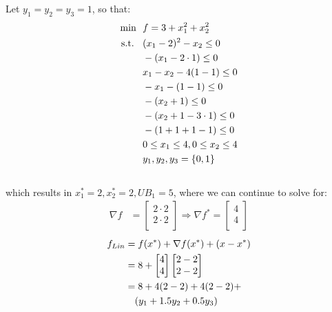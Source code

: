 \documentclass{article}
\begin{document}
Let $y_1 = y_2 = y_3 = 1$, so that:
\begin{equation}
\begin{split}
    \text{min \space} & f = 3 + x_{1}^{2} + x_{2}^{2}\\
    \text{s.t. \space} 
    & \space (x_1 - 2)^2 -x_2 \leq 0\\
    & -(x_1 - 2 \cdot 1) \leq 0\\
    & x_1 - x_2 - 4(1 - 1) \leq 0\\
    & - x_1 - (1 - 1) \leq 0\\
    & - (x_2 + 1) \leq 0\\
    & - (x_2 + 1 - 3 \cdot 1)\leq 0\\
    & - (1 + 1 + 1 - 1) \leq 0\\
    & 0 \leq x_1 \leq 4, 0 \leq x_2 \leq 4\\
    & y_1, y_2, y_3 = \{0, 1\}\\
\end{split}
\end{equation}
\\
which results in $x_{1}^{*} = 2, x_{2}^{*} = 2, UB_1 = 5$, where we can continue to solve for:
\begin{equation}
\begin{split}
\nabla f & = 
    \begin{bmatrix}
        2 \cdot 2\\
        2 \cdot 2\\
    \end{bmatrix} \Longrightarrow
\nabla f^* = 
    \begin{bmatrix}
        4\\
        4\\
    \end{bmatrix}
\end{split}
\end{equation}
\begin{equation}
\begin{split}
    f_{Lin} 
        & = f(x^*) + \nabla f(x^*) + (x-x^*)\\
        & = 8 + 
            \begin{bmatrix}
                4\\
                4\\
            \end{bmatrix}
            \begin{bmatrix}
                2 - 2\\
                2 - 2\\
            \end{bmatrix}\\
        & = 8 + 4(2 - 2) + 4(2 - 2) + \\
        & \text{\space\space\space} (y_1 + 1.5y_2 + 0.5y_3)
\end{split}
\end{equation}
\end{document}
